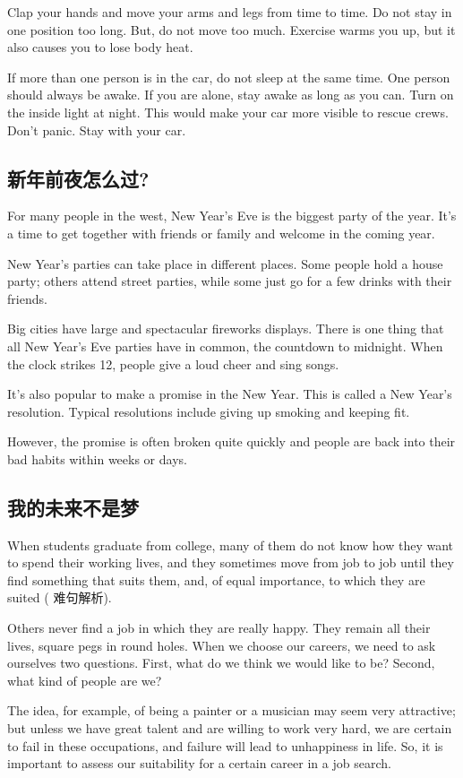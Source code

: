 Clap your hands and move your arms and legs from time
to time. Do not stay in one position too long. But, do not
move too much. Exercise warms you up, but it also
causes you to lose body heat.

If more than one person is in the car, do not sleep at the
same time. One person should always be awake. If you
are alone, stay awake as long as you can. Turn on the inside
light at night. This would make your car more visible
to rescue crews. Don't panic. Stay with your car.
\subsection{新年前夜怎么过?}
For many people in the west, New Year's Eve is the biggest
party of the year. It's a time to get together with friends or
family and welcome in the coming year.

New Year's parties can take place in different places.
Some people hold a house party; others attend street parties,
while some just go for a few drinks with their friends.

Big cities have large and spectacular fireworks displays.
There is one thing that all New Year's Eve parties have
in common, the countdown to midnight. When the clock
strikes 12, people give a loud cheer and sing songs.

It's also popular to make a promise in the New Year. This
is called a New Year's resolution. Typical resolutions
include giving up smoking and keeping fit.

However, the promise is often broken quite quickly and
people are back into their bad habits within weeks or days.

\subsection{我的未来不是梦}

When students graduate from college, many of them
do not know how they want to spend their working lives,
and they sometimes move from job to job until they find
something that suits them, and, of equal importance,
to which they are suited ( 难句解析).

Others never find a job in which they are really happy.
They remain all their lives, square pegs in round holes.
When we choose our careers, we need to ask ourselves
two questions. First, what do we think we would like to be?
Second, what kind of people are we?

The idea, for example, of being a painter or a musician
may seem very attractive; but unless we have great talent
and are willing to work very hard, we are certain to fail in
these occupations, and failure will lead to unhappiness
in life. So, it is important to assess our suitability for a
certain career in a job search.


